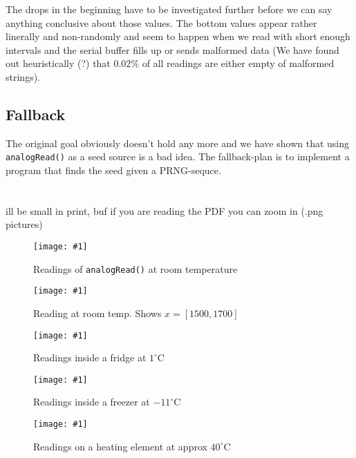 \documentclass[a4paper]{article}           %
\newcommand{\scalefig}[3]{
  \begin{figure}[ht!]
    \centering
    \texttt{[image: \#1]}
    \caption{#3}
    \label{#1}
  \end{figure}}
\newcommand{\tmpsection}[1]{}
\let\tmpsection=\section
\renewcommand{\section}[2]{

    \ifthenelse{
      \equal{#2}{Heimildir} %
    }
    {
      \tmpsection{\sc{#1} }
      \tmpsection{\sc{#2} }
    }
    {\tmpsection{\sc{#1} } }
      

}
\begin{document}
The drops in the beginning have to be investigated further before we can say anything conclusive about those values. The bottom values appear rather linerally and non-randomly and seem to happen when we read with short enough intervals and the serial buffer fills up or sends malformed data (We have found out heuristically (?) that $0.02\%$ of all readings are either empty of malformed strings).


\subsection{Fallback}

The original goal obviously doesn't hold any more and we have shown that using \texttt{analogRead()} as a seed source is a bad idea. The fallback-plan is to implement a program that finds the seed given a PRNG-sequce. 



\section{Figures}

Will be small in print, buf if you are reading the PDF you can zoom in (.png pictures)

\scalefig{img/RoomTempOverlay.png}{0.5}{Readings of \texttt{analogRead()} at room temperature}

\scalefig{img/Room_1500-1700_zoom.png}{1}{Reading at room temp. Shows $x = [1500, 1700]$} 

\scalefig{img/Fridge50k.png}{0.5}{Readings inside a fridge at $1^\circ$C} 

\scalefig{img/Freezer10k.png}{0.5}{Readings inside a freezer at $-11^\circ$C} 

\scalefig{img/HeatingElement50k.png}{0.5}{Readings on a heating element at approx $40^\circ$C}
\end{document}
